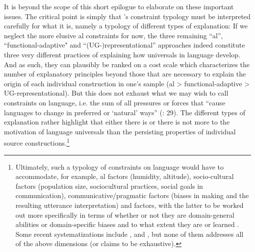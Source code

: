 \documentclass[output=paper]{langsci/langscibook}
\begin{document}
It is beyond the scope of this short epilogue to elaborate on these important issues. The critical point is simply that ’s constraint typology must be interpreted carefully for what it is, namely a typology of different types of explanation: If we neglect the more elusive al constraints for now, the three remaining “al”, “functional-adaptive" and “(UG-)representational” approaches indeed constitute three very different practices of explaining how universals in language develop. And as such, they can plausibly be ranked on a cost scale which characterizes the number of explanatory principles beyond those that are necessary to explain the origin of each individual construction in one’s sample (al > functional-adaptive > UG-representational). But this does not exhaust what we may wish to call constraints on language, i.e. the sum of all pressures or forces that “cause languages to change in preferred or ‘natural’ ways” (\citealt{BickelEtAl2015}: 29). The different types of explanation rather highlight that either there is or there is not more to the motivation of language universals than the persisting properties of individual source constructions.\footnote{Ultimately, such a typology of constraints on language would have to accommodate, for example, al factors (humidity, altitude), socio-cultural factors (population size, sociocultural practices, social goals in communication), communicative/pragmatic factors (biases in  making and the resulting utterance interpretation) and  factors, with the latter to be worked out more specifically in terms of whether or not they are domain-general abilities or domain-specific biases and to what extent they are  or learned . Some recent systematizations include \citet{ChristiansenChater2008}, \citet{EvansLevinson2009} and \citet{Bybee2010}, but none of them addresses all of the above dimensions (or claims to be exhaustive).} 
\end{document}
